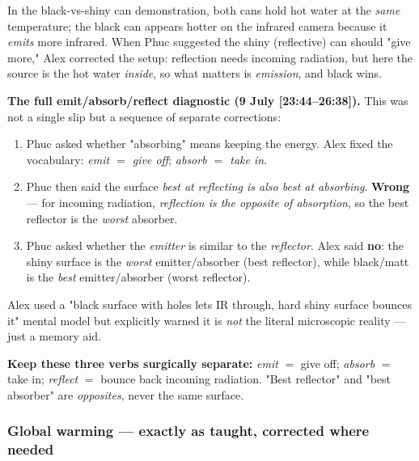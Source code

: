 \documentclass[11pt,a4paper]{article}
\newcommand{\ts}[1]{\textup{[#1]}}       %
\begin{document}
In the black-vs-shiny can demonstration, both cans hold hot water at the \emph{same}
temperature; the black can appears hotter on the infrared camera because it \emph{emits}
more infrared. When Phuc suggested the shiny (reflective) can should "give more," Alex
corrected the setup: reflection needs incoming radiation, but here the source is the hot
water \emph{inside}, so what matters is \emph{emission}, and black wins.

\begin{watchbox}
\textbf{The full emit/absorb/reflect diagnostic (9 July \ts{23:44--26:38}).} This was not a
single slip but a sequence of separate corrections:
\begin{enumerate}[leftmargin=1.5em,itemsep=1pt]
  \item Phuc asked whether "absorbing" means keeping the energy. Alex fixed the vocabulary:
        \emph{emit $=$ give off}; \emph{absorb $=$ take in}.
  \item Phuc then said the surface \emph{best at reflecting is also best at absorbing}.
        \textbf{Wrong} --- for incoming radiation, \emph{reflection is the opposite of
        absorption}, so the best reflector is the \emph{worst} absorber.
  \item Phuc asked whether the \emph{emitter} is similar to the \emph{reflector}. Alex said
        \textbf{no}: the shiny surface is the \emph{worst} emitter/absorber (best reflector),
        while black/matt is the \emph{best} emitter/absorber (worst reflector).
\end{enumerate}
Alex used a "black surface with holes lets IR through, hard shiny surface bounces it" mental
model but explicitly warned it is \emph{not} the literal microscopic reality --- just a memory
aid.
\end{watchbox}

\begin{watchbox}
\textbf{Keep these three verbs surgically separate:}
\emph{emit} $=$ give off; \emph{absorb} $=$ take in; \emph{reflect} $=$ bounce back
incoming radiation. "Best reflector" and "best absorber" are \emph{opposites}, never the
same surface.
\end{watchbox}

\subsubsection{Global warming --- exactly as taught, corrected where needed}
\end{document}
